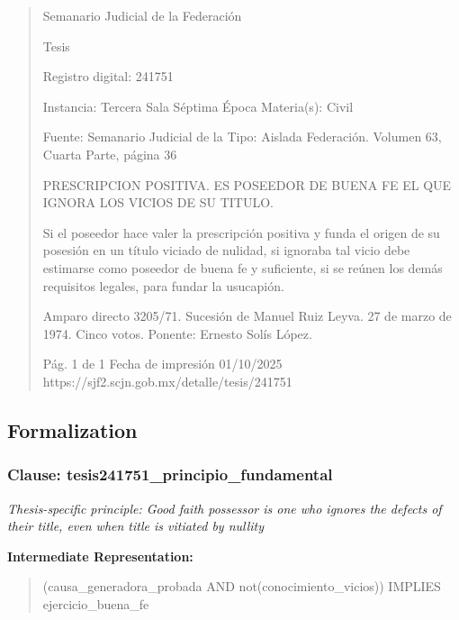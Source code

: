 \documentclass[11pt,a4paper]{article}
\begin{document}
\begin{quote}
                                                   Semanario Judicial de la Federación

                                                  Tesis

 Registro digital: 241751

 Instancia: Tercera Sala          Séptima Época                        Materia(s): Civil

                                  Fuente: Semanario Judicial de la     Tipo: Aislada
                                  Federación.
                                  Volumen 63, Cuarta Parte, página
                                  36


PRESCRIPCION POSITIVA. ES POSEEDOR DE BUENA FE EL QUE IGNORA LOS VICIOS DE
SU TITULO.


Si el poseedor hace valer la prescripción positiva y funda el origen de su posesión en un título
viciado de nulidad, si ignoraba tal vicio debe estimarse como poseedor de buena fe y suficiente, si
se reúnen los demás requisitos legales, para fundar la usucapión.


Amparo directo 3205/71. Sucesión de Manuel Ruiz Leyva. 27 de marzo de 1974. Cinco votos.
Ponente: Ernesto Solís López.




                                             Pág. 1 de 1             Fecha de impresión 01/10/2025
  https://sjf2.scjn.gob.mx/detalle/tesis/241751

\end{quote}

\subsection{Formalization}

\subsubsection{Clause: tesis241751\_principio\_fundamental}

\textit{Thesis-specific principle: Good faith possessor is one who ignores the defects of their title, even when title is vitiated by nullity}

\textbf{Intermediate Representation:}

\begin{quote}
(causa\_generadora\_probada AND not(conocimiento\_vicios)) IMPLIES ejercicio\_buena\_fe
\end{quote}
\end{document}
